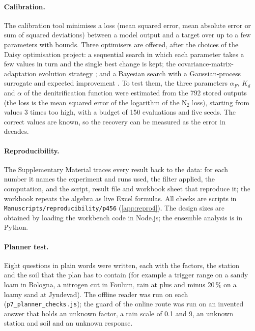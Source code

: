\paragraph{Calibration.}
The calibration tool minimises a loss (mean squared error, mean absolute error or sum of squared deviations) between a model output and a target over up to a few parameters with bounds. Three optimisers are offered, after the choices of the Daisy optimisation project: a sequential search in which each parameter takes a few values in turn and the single best change is kept; the covariance-matrix-adaptation evolution strategy \citep{HansenOstermeier2001}; and a Bayesian search with a Gaussian-process surrogate and expected improvement \citep{Mockus1978}. To test them, the three parameters $\alpha_F$, $K_d$ and $\alpha$ of the denitrification function were estimated from the 792 stored outputs (the loss is the mean squared error of the logarithm of the N$_2$ loss), starting from values 3 times too high, with a budget of 150 evaluations and five seeds. The correct values are known, so the recovery can be measured as the error in decades.

\paragraph{Reproducibility.}The Supplementary Material traces every result back to the data: for each number it names the experiment and runs used, the filter applied, the computation, and the script, result file and workbook sheet that reproduce it; the workbook repeats the algebra as live Excel formulas. 
All checks are scripts in \texttt{Manuscripts/reproducibility/p456} (\cref{app:repro4}). The design sizes are obtained by loading the workbench code in Node.js; the ensemble analysis is in Python.

\paragraph{Planner test.}
Eight questions in plain words were written, each with the factors, the station and the soil that the plan has to contain (for example a trigger range on a sandy loam in Bologna, a nitrogen cut in Foulum, rain at plus and minus 20\,\% on a loamy sand at Jyndevad). The offline reader was run on each (\texttt{p7\_planner\_checks.js}); the guard of the online route was run on an invented answer that holds an unknown factor, a rain scale of 0.1 and 9, an unknown station and soil and an unknown response.


